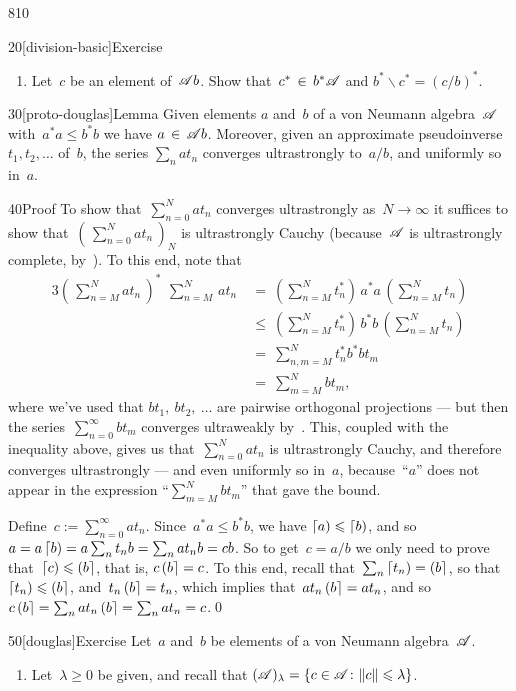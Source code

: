 \begin{parsec}{810}
\begin{point}{20}[division-basic]{Exercise}
\begin{enumerate}
Show that~$dc\in a\scrA b$,
and~$a\backslash (dc) / b  = (a\backslash d)\,(c/b)$.
\item
\label{division-basic-star}
Let~$c$ be an element of~$\mathscr{A} b$.
Show that~$c^* \,\in\, b^* \mathscr{A}$
and $b^*\backslash c^* = (c/b)^*$.
\end{enumerate}%
\spacingfix%
\end{point}%
\begin{point}{30}[proto-douglas]{Lemma}%
Given elements $a$ and~$b$ of a von Neumann algebra~$\mathscr{A}$
with~$a^*a \leq b^*b$
we have $a\,\in\, \mathscr{A} b$.
Moreover,
given an approximate pseudoinverse $t_1,t_2,\dotsc$
of~$b$,
the series $\sum_nat_n$ converges ultrastrongly to~$a/b$,%
and uniformly so in~$a$.
\begin{point}{40}{Proof}%
To show that~$\sum_{n=0}^N at_n$
converges ultrastrongly as~$N\to \infty$
it suffices
to show that~$(\,\sum_{n=0}^N at_n\,)_N$
is ultrastrongly Cauchy
(because~$\mathscr{A}$ is ultrastrongly complete, by~).
To this end, note that
\begin{alignat*}{3}
\textstyle 
(\, \sum_{n=M}^N at_n\,)^*\ \,\sum_{n=M}^N\,at_n
\ &= \textstyle\ (\sum_{n=M}^Nt_n^*) \,a^*a\, (\sum_{n=M}^N t_n)
\\
\ &\leq\ \textstyle 
 (\sum_{n=M}^N t_n^*) \,b^*b\, (\sum_{n=M}^Nt_n)
\\
\ &= \ \textstyle 
\sum_{n,m=M}^N
t_n^*b^*bt_m 
\\
\ &=\ \textstyle 
\sum_{m=M}^N
bt_m,
\end{alignat*}
where we've used that
$bt_1,\ bt_2,\ \dotsc$
are pairwise orthogonal projections
--- but then the series~$\sum_{n=0}^\infty bt_m$
converges ultraweakly by~.
This, coupled with the
inequality above,
gives us that~$\sum_{n=0}^N at_n$
is ultrastrongly Cauchy,
and therefore converges ultrastrongly --- 
and even uniformly so in~$a$,
because~``$a$'' does not appear in
the expression
``$\sum_{m=M}^N bt_m$'' that gave the bound.

Define~$c:=\sum_{n=0}^\infty at_n$.
Since~$a^*a \leq b^*b$,
we have $\left\lceil a\right)\leqslant \left\lceil b\right)$,
and so~$a=a\left\lceil b\right) = a\sum_n t_n b = \sum_n at_n b = cb$. 
So to get~$c=a/b$
we only need to prove that~$\left\lceil c\right)\leqslant \left(b\right\rceil$,
that is, $c\left(b\right\rceil=c$.
To this end,
recall that~$\sum_n \left\lceil t_n\right)=\left(b\right\rceil$,
so that~$\left\lceil t_n\right)\leqslant \left(b\right\rceil$,
and~$t_n\left(b\right\rceil=t_n$,
which implies
that~$at_n\left(b\right\rceil=at_n$,
and so~$c\left(b\right\rceil=\sum_n at_n\left(b\right\rceil
= \sum_n at_n=c$.\qed
\end{point}
\end{point}
\begin{point}{50}[douglas]{Exercise}%
Let~$a$ and~$b$ be elements of a von Neumann algebra~$\mathscr{A}$.
\begin{enumerate}
\item
Let~$\lambda\geq 0$ be given,
and recall that $(\mathscr{A})_\lambda 
= \{c\in\mathscr{A}\colon \|c\|\leqslant\lambda\}$.


\end{enumerate}
\end{point}
\end{parsec}
